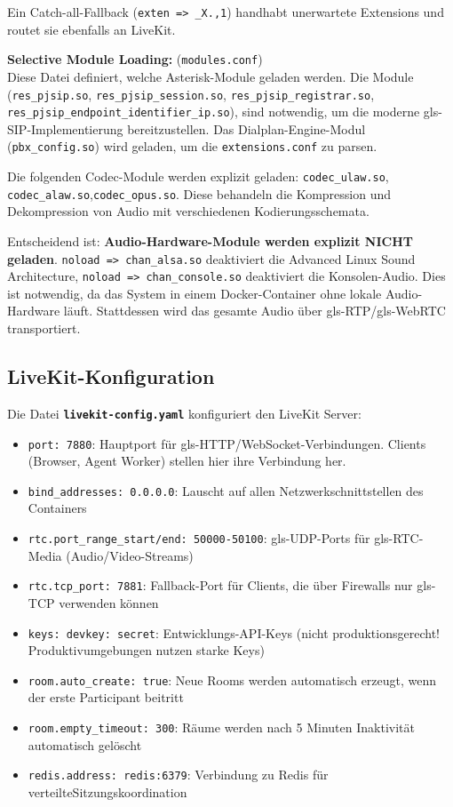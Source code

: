 Ein Catch-all-Fallback (\texttt{exten => \_X.,1}) handhabt unerwartete Extensions und routet sie ebenfalls an LiveKit.


\textbf{Selective Module Loading:} (\texttt{modules.conf})\\
Diese Datei definiert, welche Asterisk-Module geladen werden. Die Module\\ (\texttt{res\_pjsip.so}, \texttt{res\_pjsip\_session.so}, \texttt{res\_pjsip\_registrar.so},\\ \texttt{res\_pjsip\_endpoint\_identifier\_ip.so}), sind notwendig, um die moderne \gls{gls-SIP}-Implementierung bereitzustellen. Das Dialplan-Engine-Modul (\texttt{pbx\_config.so}) wird geladen, um die \texttt{extensions.conf} zu parsen.

Die folgenden Codec-Module werden explizit geladen: \texttt{codec\_ulaw.so}, \texttt{codec\_alaw.so},\newline \texttt{codec\_opus.so}. Diese behandeln die Kompression und Dekompression von Audio mit verschiedenen Kodierungsschemata.

Entscheidend ist: \textbf{Audio-Hardware-Module werden explizit NICHT geladen}. \texttt{noload => chan\_alsa.so} deaktiviert die Advanced Linux Sound Architecture, \texttt{noload => chan\_console.so} deaktiviert die Konsolen-Audio. Dies ist notwendig, da das System in einem Docker-Container ohne lokale Audio-Hardware läuft. Stattdessen wird das gesamte Audio über \gls{gls-RTP}/\gls{gls-WebRTC} transportiert.

\subsection{LiveKit-Konfiguration}

Die Datei \textbf{\texttt{livekit-config.yaml}} konfiguriert den LiveKit Server:

\begin{itemize}
  \item \texttt{port: 7880}: Hauptport für \gls{gls-HTTP}/WebSocket-Verbindungen. Clients (Browser,
Agent Worker) stellen hier ihre Verbindung her.
  \item \texttt{bind\_addresses: 0.0.0.0}: Lauscht auf allen Netzwerkschnittstellen des Containers
  \item \texttt{rtc.port\_range\_start/end: 50000-50100}: \gls{gls-UDP}-Ports für \gls{gls-RTC}-Media (Audio/Video-Streams)
  \item \texttt{rtc.tcp\_port: 7881}: Fallback-Port für Clients, die über Firewalls nur \gls{gls-TCP} verwenden können
  \item \texttt{keys: devkey: secret}: Entwicklungs-API-Keys (nicht produktionsgerecht! Produktivumgebungen nutzen starke Keys)
  \item \texttt{room.auto\_create: true}: Neue Rooms werden automatisch erzeugt, wenn der erste Participant beitritt
  \item \texttt{room.empty\_timeout: 300}: Räume werden nach 5 Minuten Inaktivität automatisch gelöscht
  \item \texttt{redis.address: redis:6379}: Verbindung zu Redis für verteilte\newline Sitzungskoordination
\end{itemize}

